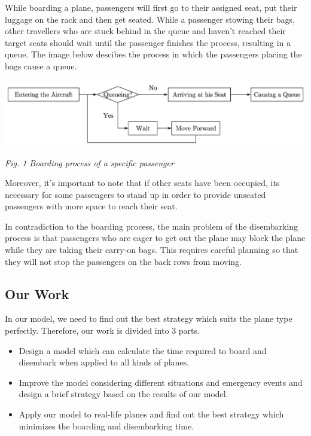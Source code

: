 \documentclass{article}
\theoremstyle{definition}
\theoremstyle{remark}
\numberwithin{equation}{section}
\begin{document}
	While boarding a plane, passengers will first go to their assigned seat, put their luggage on the rack and then get seated. While a passenger stowing their bags, other travellers who are stuck behind in the queue and haven't reached their target seats should wait until the passenger finishes the process, resulting in a queue. The image below descibes the process in which the passengers placing the bags cause a queue.

	\begin{center}
		\includegraphics[width=14cm]{chart.jpg}

		\textit{Fig. 1 Boarding process of a specific passenger}
	\end{center}

	Moreover, it's important to note that if other seats have been occupied, its necessary for some passengers to stand up in order to provide unseated passengers with more space to reach their seat.

	In contradiction to the boarding process, the main problem of the disembarking process is that passengers who are eager to get out the plane may block the plane while they are taking their carry-on bags. This requires careful planning so that they will not stop the passengers on the back rows from moving.
	\subsection{Our Work}
	In our model, we need to find out the best strategy which suits the plane type perfectly. Therefore, our work is divided into 3 parts.
	\begin{itemize}
		\item Design a model which can calculate the time required to board and disembark when applied to all kinds of planes.
		\item Improve the model considering different situations and emergency events and design a brief strategy based on the results of our model.
		\item Apply our model to real-life planes and find out the best strategy which minimizes the boarding and disembarking time.
	\end{itemize}
\end{document}
